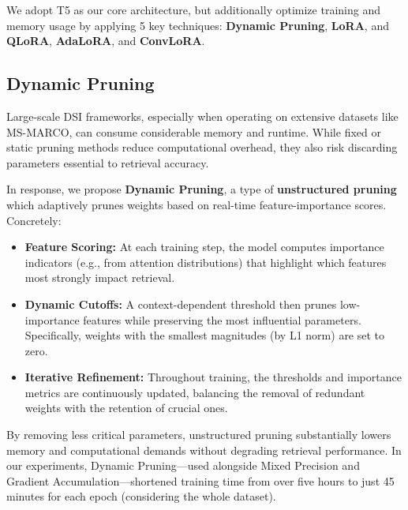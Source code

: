 We adopt T5 as our core architecture, but additionally optimize training and memory usage by applying 5 key techniques: \textbf{Dynamic Pruning}, \textbf{LoRA}\cite{hu2021loralowrankadaptationlarge}, and \textbf{QLoRA}\cite{dettmers2023qloraefficientfinetuningquantized}, \textbf{AdaLoRA}\cite{liu2024aloraallocatinglowrankadaptation}, and \textbf{ConvLoRA}\cite{aleem2024convloraadabnbaseddomain}. 

\subsection{Dynamic Pruning}
Large-scale DSI frameworks, especially when operating on extensive datasets like MS-MARCO\cite{bajaj2018msmarcohumangenerated}, can consume considerable memory and runtime. While fixed or static pruning methods reduce computational overhead, they also risk discarding parameters essential to retrieval accuracy.

In response, we propose \textbf{Dynamic Pruning}, a type of \textbf{unstructured pruning} which adaptively prunes weights based on real-time feature-importance scores. Concretely:
\begin{itemize}
    \item \textbf{Feature Scoring:} At each training step, the model computes importance indicators (e.g., from attention distributions) that highlight which features most strongly impact retrieval.
    \item \textbf{Dynamic Cutoffs:} A context-dependent threshold then prunes low-importance features while preserving the most influential parameters. Specifically, weights with the smallest magnitudes (by L1 norm) are set to zero.
    \item \textbf{Iterative Refinement:} Throughout training, the thresholds and importance metrics are continuously updated, balancing the removal of redundant weights with the retention of crucial ones.
\end{itemize}
By removing less critical parameters, unstructured pruning substantially lowers memory and computational demands without degrading retrieval performance. In our experiments, Dynamic Pruning—used alongside Mixed Precision and Gradient Accumulation—shortened training time from over five hours to just 45 minutes for each epoch (considering the whole dataset). 


